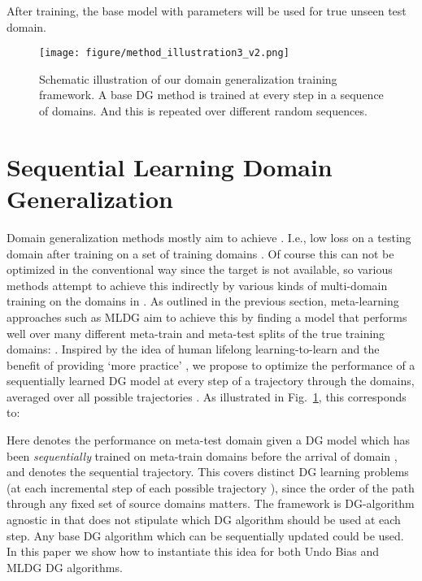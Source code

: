 \documentclass[runningheads]{llncs}
\begin{document}
\small

\normalsize

\noindent After training, the base model with parameters  will be used for true unseen test domain.



\begin{figure}[t]
\centering
\texttt{[image: figure/method\_illustration3\_v2.png]}
\caption{Schematic illustration of our domain generalization training framework. A base DG method is trained at every step in a sequence of domains. And this is repeated over different random sequences.}
\label{fig:method-illustration}
\end{figure}

\section{Sequential Learning Domain Generalization}
Domain generalization methods mostly aim to achieve . I.e., low loss on a testing domain  after training on a set of training domains . Of course this can not be optimized in the conventional way since the target  is not available, so various methods \cite{ECCV12_Khosla,ghifary2015domain,muandet2013domaingeneralization} attempt to achieve this indirectly by various kinds of multi-domain training on the domains in . As outlined in the previous section, meta-learning approaches such as MLDG aim to achieve this by finding a model that performs well over many different meta-train and meta-test splits of the true training domains: . Inspired by the idea of human lifelong learning-to-learn \cite{smith2002humanL2L} and the benefit of providing `more practice' \cite{doersch2017mtlSelfSup,jaderberg2017unsupAuxRL}, we propose to optimize the performance of a sequentially learned DG model at every step of a trajectory  through the domains, averaged over all possible trajectories . As illustrated in Fig.~\ref{fig:method-illustration}, this corresponds to:
\small

\normalsize
Here  denotes the performance on meta-test domain  given a DG model which has been \emph{sequentially} trained on meta-train domains before the arrival of domain , and  denotes the sequential trajectory. This covers  distinct DG learning problems (at each incremental step of each possible trajectory ), since the order of the path through any fixed set of source domains matters. The  framework is DG-algorithm agnostic in that does not stipulate which DG algorithm should be used at each step. Any base DG algorithm which can be sequentially updated could be used. In this paper we show how to instantiate this idea for both Undo Bias \cite{ECCV12_Khosla} and MLDG \cite{Li2018MLDG} DG algorithms.
\end{document}
